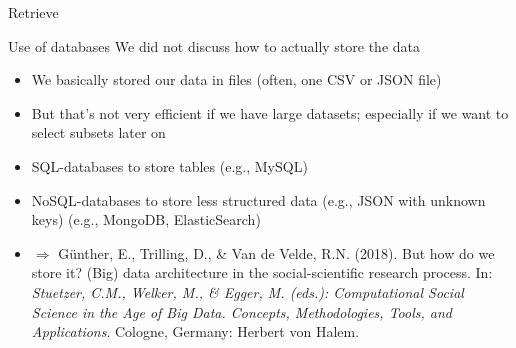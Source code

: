 \documentclass{beamer}
\begin{document}
\begin{frame}{Retrieve}
	\begin{block}{Use of databases}
	We did not discuss how to actually store the data
	\begin{itemize}
		\item We basically stored our data in files (often, one CSV or JSON file)
		\item But that's not very efficient if we have large datasets; especially if we want to select subsets later on
		\item SQL-databases to store tables (e.g., MySQL)
		\item NoSQL-databases to store less structured data (e.g., JSON with unknown keys) (e.g., MongoDB, ElasticSearch)
		\item $\Rightarrow$ \tiny{Günther, E., Trilling, D., \& Van de Velde, R.N. (2018). But how do we store it? (Big) data architecture in the social-scientific research process. In:\textit{ Stuetzer, C.M., Welker, M., \& Egger, M. (eds.): Computational Social Science in the Age of Big Data. Concepts, Methodologies, Tools, and Applications}. Cologne, Germany: Herbert von Halem.}
	\end{itemize}
	\end{block}
\end{frame}
\end{document}

